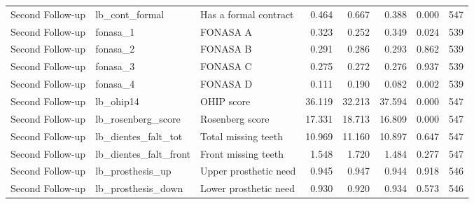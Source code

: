 \begin{table}
\begin{tabular}[t]{lllrrrrr}
Second Follow-up & lb\_cont\_formal & Has a formal contract & 0.464 & 0.667 & 0.388 & 0.000 & 547\\
Second Follow-up & fonasa\_1 & FONASA A & 0.323 & 0.252 & 0.349 & 0.024 & 539\\
Second Follow-up & fonasa\_2 & FONASA B & 0.291 & 0.286 & 0.293 & 0.862 & 539\\
Second Follow-up & fonasa\_3 & FONASA C & 0.275 & 0.272 & 0.276 & 0.937 & 539\\
\addlinespace
Second Follow-up & fonasa\_4 & FONASA D & 0.111 & 0.190 & 0.082 & 0.002 & 539\\
Second Follow-up & lb\_ohip14 & OHIP score & 36.119 & 32.213 & 37.594 & 0.000 & 547\\
Second Follow-up & lb\_rosenberg\_score & Rosenberg score & 17.331 & 18.713 & 16.809 & 0.000 & 547\\
Second Follow-up & lb\_dientes\_falt\_tot & Total missing teeth & 10.969 & 11.160 & 10.897 & 0.647 & 547\\
Second Follow-up & lb\_dientes\_falt\_front & Front missing teeth & 1.548 & 1.720 & 1.484 & 0.277 & 547\\
\addlinespace
Second Follow-up & lb\_prosthesis\_up & Upper prosthetic need & 0.945 & 0.947 & 0.944 & 0.918 & 546\\
Second Follow-up & lb\_prosthesis\_down & Lower prosthetic need & 0.930 & 0.920 & 0.934 & 0.573 & 546\\
\bottomrule
\end{tabular}
\end{table}
